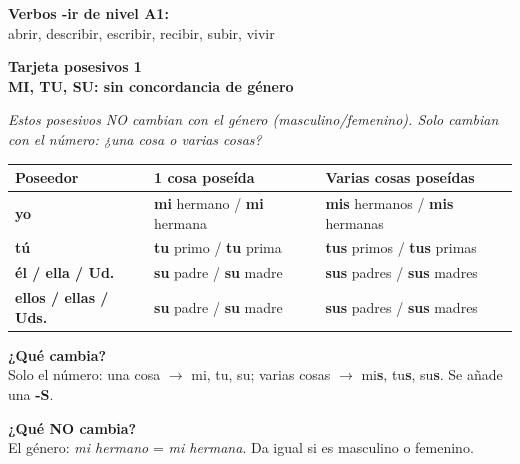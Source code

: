 \documentclass[a4paper,10pt]{article}
\newcommand{\posheader}[2]{%
  \noindent
  \colorbox{moradopos!90}{\parbox{\dimexpr\linewidth-2\fboxsep}{%
    \centering\color{white}\bfseries\large Tarjeta posesivos #1\\[2pt]
    \normalsize #2%
  }}
  \vspace{4pt}
}
\begin{document}
\vspace{4pt}
\textbf{Verbos -ir de nivel A1:}\\
{\footnotesize abrir, describir, escribir, recibir, subir, vivir}

\newpage


\posheader{1}{MI, TU, SU: sin concordancia de género}

\vspace{4pt}
\small
\textit{Estos posesivos NO cambian con el género (masculino/femenino). Solo cambian con el número: ¿una cosa o varias cosas?}

\vspace{6pt}

\begin{center}
\begin{tabular}{|l|l|l|}
\hline
\rowcolor{moradopos!20}
\textbf{Poseedor} & \textbf{1 cosa poseída} & \textbf{Varias cosas poseídas} \\
\hline
\textbf{yo} & \textbf{mi} hermano / \textbf{mi} hermana & \textbf{mis} hermanos / \textbf{mis} hermanas \\
\hline
\rowcolor{grisclaro}
\textbf{tú} & \textbf{tu} primo / \textbf{tu} prima & \textbf{tus} primos / \textbf{tus} primas \\
\hline
\textbf{él / ella / Ud.} & \textbf{su} padre / \textbf{su} madre & \textbf{sus} padres / \textbf{sus} madres \\
\hline
\rowcolor{grisclaro}
\textbf{ellos / ellas / Uds.} & \textbf{su} padre / \textbf{su} madre & \textbf{sus} padres / \textbf{sus} madres \\
\hline
\end{tabular}
\end{center}

\vspace{6pt}

\textbf{¿Qué cambia?}\\
Solo el número: una cosa $\to$ mi, tu, su; varias cosas $\to$ mi\textbf{s}, tu\textbf{s}, su\textbf{s}. Se añade una \textbf{-S}.

\vspace{4pt}
\textbf{¿Qué NO cambia?}\\
El género: \textit{mi hermano} = \textit{mi hermana}. Da igual si es masculino o femenino.
\end{document}
